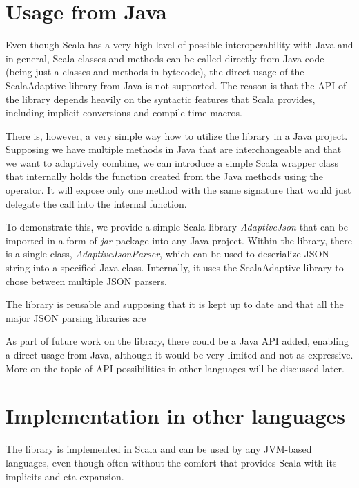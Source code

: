 \section{Usage from Java}

Even though Scala has a very high level of possible interoperability with Java and in general, Scala classes and methods can be called directly from Java code (being just a classes and methods in bytecode), the direct usage of the ScalaAdaptive library from Java is not supported. The reason is that the API of the library depends heavily on the syntactic features that Scala provides, including implicit conversions and compile-time macros.

There is, however, a very simple way how to utilize the library in a Java project. Supposing we have multiple methods in Java that are interchangeable and that we want to adaptively combine, we can introduce a simple Scala wrapper class that internally holds the function created from the Java methods using the  operator. It will expose only one method with the same signature that would just delegate the call into the internal function.

To demonstrate this, we provide a simple Scala library \textit{AdaptiveJson} that can be imported in a form of \textit{jar} package into any Java project. Within the library, there is a single class, \textit{AdaptiveJsonParser}, which can be used to deserialize JSON string into a specified Java class. Internally, it uses the ScalaAdaptive library to chose between multiple JSON parsers.

The library is reusable and supposing that it is kept up to date and that all the major JSON parsing libraries are 


As part of future work on the library, there could be a Java API added, enabling a direct usage from Java, although it would be very limited and not as expressive. More on the topic of API possibilities in other languages will be discussed later.

\section{Implementation in other languages}

The library is implemented in Scala and can be used by any JVM-based languages, even though often without the comfort that provides Scala with its implicits and eta-expansion.

